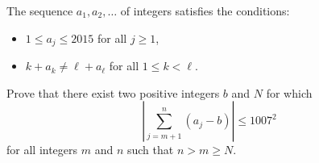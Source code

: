 The sequence 
$a_1,a_2,\dots$
 of integers satisfies the conditions:

\begin{itemize}
    \item $1\le a_j\le2015$
     for all 
    $j\ge1$, 
    \item $k+a_k\neq \ell+a_\ell$
     for all 
    $1\le k<\ell$.
\end{itemize}

Prove that there exist two positive integers 
$b$
 and 
$N$
 for which
\[\left\vert\sum_{j=m+1}^n(a_j-b)\right\vert\le1007^2\]
for all integers 
$m$
 and 
$n$
 such that 
$n>m\ge N$.
